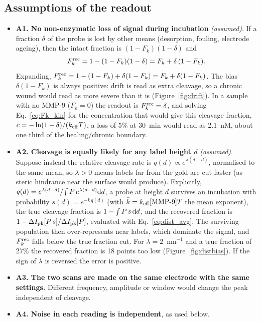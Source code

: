 \documentclass[10pt,a4paper]{article}
\numberwithin{equation}{section}
\newcommand{\DI}{\Delta I}
\newcommand{\Fk}{F_k}
\newcommand{\Fkrec}{F_k^{\rm rec}}
\newcommand{\FLAG}{\textit{(assumed)}}
\newcommand{\figref}[1]{Figure~\ref{#1}}
\newenvironment{assump}{\small}{\smallskip}
\newcommand{\blankAppFive}{2.1}
\newcommand{\distBiasPts}{18}
\newcommand{\distBiasTrue}{27}
\begin{document}
\subsection{Assumptions of the readout}

\begin{assump}
\begin{itemize}[leftmargin=*]
\item \textbf{A1. No non-enzymatic loss of signal during incubation} \FLAG. If a fraction $\delta$ of the probe
  is lost by other means (desorption, fouling, electrode ageing), then the intact fraction is
  $(1-\Fk)(1-\delta)$ and
  \begin{equation}
    \Fkrec=1-(1-\Fk)(1-\delta)=\Fk+\delta\,(1-\Fk).
    \label{eq:drift}
  \end{equation}
  Expanding, $\Fkrec=1-(1-\Fk)+\delta(1-\Fk)=\Fk+\delta(1-\Fk)$. The bias $\delta(1-\Fk)$ is always positive: drift is read as extra cleavage, so a chronic wound
  would read as more severe than it is (\figref{fig:drift}). In a sample with no MMP-9 ($\Fk=0$) the readout is $\Fkrec=\delta$, and solving Eq.~\eqref{eq:Fk_kin} for the concentration that would give this
  cleavage fraction, $c=-\ln(1-\delta)/(k_{\rm eff}T)$, a loss of
  5\% at 30~min would read as \blankAppFive~nM, about one third of the healing/chronic boundary.
\item \textbf{A2. Cleavage is equally likely for any label height $d$} \FLAG. Suppose instead the
  relative cleavage rate is $q(d)\propto e^{\lambda(d-\bar d)}$, normalised to the same mean,
  so $\lambda>0$ means labels far from the gold are cut faster (as steric hindrance near the surface would
  produce). Explicitly, $q(d)=e^{\lambda(d-\bar d)}/\!\int P\,e^{\lambda(d-\bar d)}{\rm d}d$, a probe at height $d$ survives an
  incubation with probability $s(d)=e^{-\bar k\,q(d)}$ (with $\bar k=k_{\rm eff}[\text{MMP-9}]T$ the mean exponent), the true
  cleavage fraction is $1-\int P\,s\,{\rm d}d$, and the recovered fraction is $1-\DI_{\rm pk}[P\,s]/\DI_{\rm pk}[P]$, evaluated with
  Eq.~\eqref{eq:dist_avg}. The surviving population then over-represents near labels, which dominate the signal,
  and $\Fkrec$ falls below the true fraction cut. For $\lambda=2$~nm$^{-1}$ and a true fraction of
  \distBiasTrue\% the recovered fraction is \distBiasPts{} points too low (\figref{fig:distbias}). If the sign of $\lambda$ is reversed the error is positive.
\item \textbf{A3. The two scans are made on the same electrode with the same settings.} Different
  frequency, amplitude or window would change the peak independent of cleavage.
\item \textbf{A4. Noise in each reading is independent}, as used below.
\end{itemize}
\end{assump}
\end{document}
